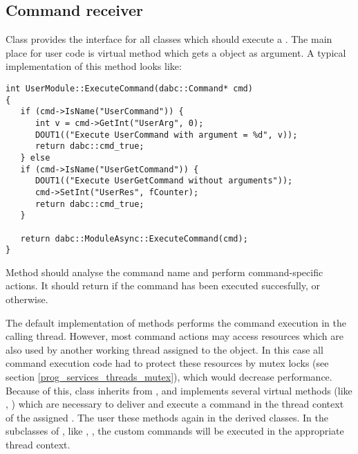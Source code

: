 \subsection{Command receiver}

Class  provides the interface for all classes
which should execute a .
The main place for user code is virtual method  
which gets a  
object as argument. 
A typical implementation of this method looks like:

\begin{small}
\begin{verbatim}
int UserModule::ExecuteCommand(dabc::Command* cmd)
{
   if (cmd->IsName("UserCommand")) {
      int v = cmd->GetInt("UserArg", 0);
      DOUT1(("Execute UserCommand with argument = %d", v));
      return dabc::cmd_true;
   } else
   if (cmd->IsName("UserGetCommand")) {
      DOUT1(("Execute UserGetCommand without arguments"));
      cmd->SetInt("UserRes", fCounter);
      return dabc::cmd_true;
   } 
      
   return dabc::ModuleAsync::ExecuteCommand(cmd);
}
\end{verbatim}     
\end{small}
 
Method  should analyse the command name and perform command-specific
actions. It should return  if the command has been executed 
succesfully, or  otherwise.  

The default implementation of  methods performs 
the command execution in the calling thread.
However, most command actions may access resources which are also
used by another working thread assigned to the  object.
In this case all command execution code had to protect these resources
by mutex locks (see section \ref{prog_services_threads_mutex}), which
would decrease performance. Because of this, class
 inherits from ,
and implements several virtual methods (like , ) 
which are necessary to deliver and execute a command in the thread context of the
assigned .
The user  these methods again in the derived classes.
In the \dabc~ subclasses of , like , , the custom commands will be executed 
in the appropriate thread context.  

